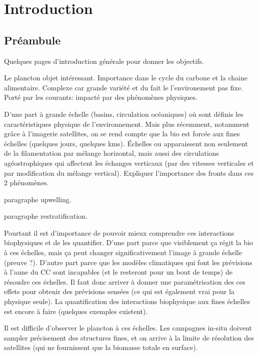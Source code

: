 \documentclass[master]{subfiles}
\begin{document}
\chapter{Introduction}
\label{chp:introduction}

\tocsubfile%

\section{Préambule}

Quelques pages d'introduction générale pour donner les objectifs.

Le plancton objet intéressant.
Importance dans le cycle du carbone et la chaine alimentaire.
Complexe car grande variété et du fait le l'environement pas fixe.
Porté par les courants: impacté par des phénomènes physiques.

D'une part à grande échelle (basins, circulation océaniques) où sont définis les caractéristiques physique de l'environnement.
Mais plus récemment, notamment grâce à l'imagerie satellites, on se rend compte que la bio est forcée aux fines échelles (quelques jours, quelques kms). Échelles ou apparaissent non seulement de la filamentation par mélange horizontal, mais aussi des circulations agéostrophiques qui affectent les échanges verticaux (par des vitesses verticales et par modification du mélange vertical).
Expliquer l'importance des fronts dans ces 2 phénomènes.

paragraphe upwelling.

paragraphe restratification.

Pourtant il est d'importance de pouvoir mieux comprendre ces interactions biophysiques et de les quantifier.
D'une part parce que visiblement ça régit la bio à ces échelles, mais ça peut changer significativement l'image à grande échelle (preuve ?).
D'autre part parce que les modèles climatiques qui font les prévisions à l'aune du CC sont incapables (et le resteront pour un bout de temps) de résoudre ces échelles. Il faut donc arriver à donner une paramétrisation des ces effets pour obtenir des prévisions sensées (ce qui est également vrai pour la physique seule).
La quantification des interactions biophysique aux fines échelles est encore à faire (quelques exemples existent).

Il est difficile d'observer le plancton à ces échelles. Les campagnes in-situ doivent sampler précisement des structures fines, et on arrive à la limite de résolution des satellites (qui ne fournissent que la biomasse totale en surface).
\end{document}
